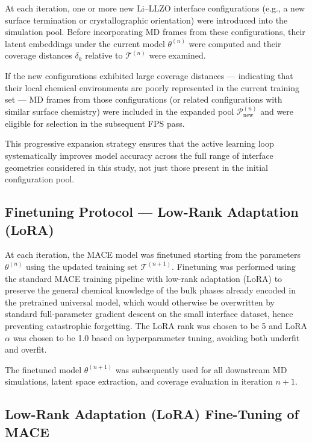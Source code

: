 \documentclass[12pt,a4paper,oneside]{book}
\begin{document}
At each iteration, one or more new Li--LLZO interface configurations
(e.g., a new surface termination or crystallographic orientation) were
introduced into the simulation pool. Before incorporating MD frames
from these configurations, their latent embeddings under the current
model $\theta^{(n)}$ were computed and their coverage distances
$\delta_k$ relative to $\mathcal{T}^{(n)}$ were examined.

If the new configurations exhibited large coverage distances --- indicating
that their local chemical environments are poorly represented in the
current training set --- MD frames from those configurations (or related
configurations with similar surface chemistry) were included in the
expanded pool $\mathcal{P}^{(n)}_{\mathrm{new}}$ and were eligible for
selection in the subsequent FPS pass.

This progressive expansion strategy ensures that the active learning loop
systematically improves model accuracy across the full range of interface
geometries considered in this study, not just those present in the
initial configuration pool.

\subsection{Finetuning Protocol --- Low-Rank Adaptation (LoRA)}

At each iteration, the MACE model was finetuned starting from the
parameters $\theta^{(n)}$ using the updated training set
$\mathcal{T}^{(n+1)}$. Finetuning was performed using the standard
MACE training pipeline with low-rank adaptation (LoRA) to preserve the general chemical knowledge 
of the bulk phases already encoded in the pretrained universal model, which 
would otherwise be overwritten by standard full-parameter gradient descent 
on the small interface dataset, hence preventing catastrophic forgetting.
The LoRA rank was chosen to be 5 and LoRA $\alpha$ was chosen to be 1.0 based on hyperparameter tuning, avoiding both underfit and overfit.

The finetuned model $\theta^{(n+1)}$ was subsequently used for all
downstream MD simulations, latent space extraction, and coverage
evaluation in iteration $n+1$.

\subsection{Low-Rank Adaptation (LoRA) Fine-Tuning of MACE}
\end{document}
